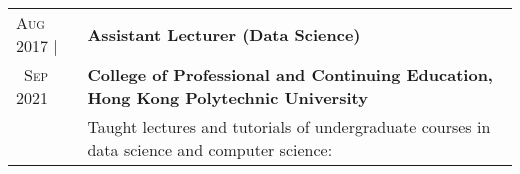 \documentclass[10pt, oneside]{article}
\begin{document}
\begin{tabularx}{\linewidth}{p{2.2cm}|p{16cm}}
	\textsc{Aug} 2017 | & \textbf{Assistant Lecturer (Data Science)}\\
	\textsc{~Sep} 2021 & \textbf{College of Professional and Continuing Education, Hong Kong Polytechnic University}\\
	& Taught lectures and tutorials of undergraduate courses in data science and computer science:\\

\end{tabularx}
\end{document}
